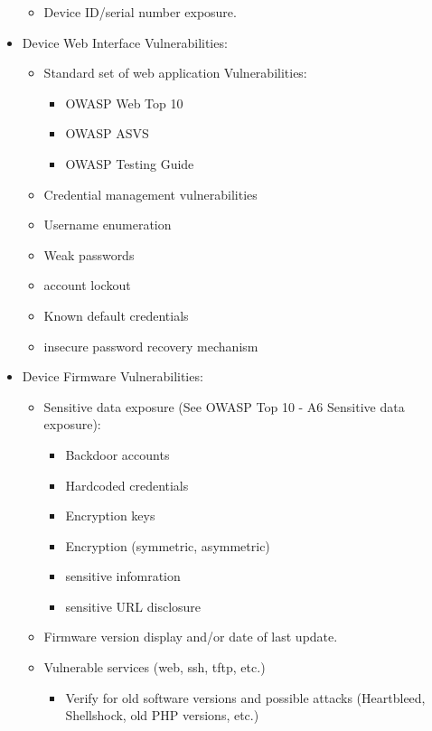 \begin{itemize}
\begin{itemize}
        \item Device ID/serial number exposure.
    \end{itemize}
    \item Device Web Interface Vulnerabilities:
    \begin{itemize}
        \item Standard set of web application Vulnerabilities:
        \begin{itemize}
            \item OWASP Web Top 10
            \item OWASP ASVS
            \item OWASP Testing Guide
        \end{itemize}
        \item Credential management vulnerabilities
        \item Username enumeration
        \item Weak passwords
        \item account lockout
        \item Known default credentials
        \item insecure password recovery mechanism
    \end{itemize}
    \item Device Firmware Vulnerabilities:
    \begin{itemize}
        \item Sensitive data exposure (See OWASP Top 10 - A6 Sensitive data exposure):
        \begin{itemize}
            \item Backdoor accounts
            \item Hardcoded credentials
            \item Encryption keys
            \item Encryption (symmetric, asymmetric)
            \item sensitive infomration
            \item sensitive URL disclosure
        \end{itemize}
        \item Firmware version display and/or date of last update.
        \item Vulnerable services (web, ssh, tftp, etc.)
        \begin{itemize}
            \item Verify for old software versions and possible attacks (Heartbleed, Shellshock, old PHP versions, etc.)
        \end{itemize}

\end{itemize}
\end{itemize}
